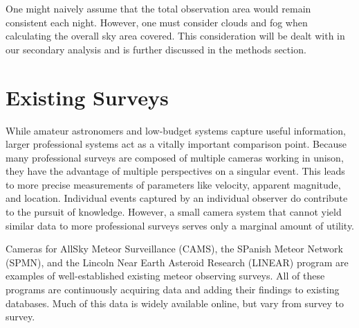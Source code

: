 One might naively assume that the total observation area would remain consistent each night.
However, one must consider clouds and fog when calculating the overall sky area covered.
This consideration will be dealt with in our secondary analysis and is further discussed in the methods section.


\section{Existing Surveys}
While amateur astronomers and low-budget systems capture useful information, larger professional systems act as a vitally important comparison point.
Because many professional surveys are composed of multiple cameras working in unison, they have the advantage of multiple perspectives on a singular event.
This leads to more precise measurements of parameters like velocity, apparent magnitude, and location.
Individual events captured by an individual observer do contribute to the pursuit of knowledge.
However, a small camera system that cannot yield similar data to more professional surveys serves only a marginal amount of utility.


Cameras for AllSky Meteor Surveillance (CAMS), the SPanish Meteor Network (SPMN), and the Lincoln Near Earth Asteroid Research (LINEAR) program are examples of well-established existing meteor observing surveys. 
All of these programs are continuously acquiring data and adding their findings to existing databases.  
Much of this data is widely available online, but vary from survey to survey.


